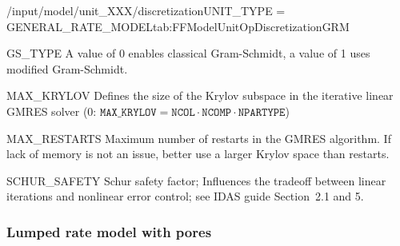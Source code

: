 \begin{condsubgroup}{/input/model/unit\_XXX/discretization}{UNIT\_TYPE = GENERAL\_RATE\_MODEL}{tab:FFModelUnitOpDiscretizationGRM}
\begin{dataset}[type=int,range={$\{0, 1\}$},length=1]{GS\_TYPE}
    A value of $0$ enables classical Gram-Schmidt, a value of 1 uses modified Gram-Schmidt.
  \end{dataset}
  \begin{dataset}[type=int,range={$\{0, \dots, \texttt{NCOL} \cdot \texttt{NCOMP} \cdot \texttt{NPARTYPE} \}$},length=1]{MAX\_KRYLOV}
    Defines the size of the Krylov subspace in the iterative linear GMRES solver (0: $\texttt{MAX\_KRYLOV} = \texttt{NCOL} \cdot \texttt{NCOMP} \cdot \texttt{NPARTYPE}$)
  \end{dataset}
  \begin{dataset}[type=int,range={$\geq 0$},length=1]{MAX\_RESTARTS}
    Maximum number of restarts in the GMRES algorithm. If lack of memory is not an issue, better use a larger Krylov space than restarts.
  \end{dataset}
  \begin{dataset}[type=double,range={$\geq 0$},length=1]{SCHUR\_SAFETY}
    Schur safety factor; Influences the tradeoff between linear iterations and nonlinear error control; see IDAS guide Section~2.1 and 5.
  \end{dataset}
\end{condsubgroup}

\subsubsection{Lumped rate model with pores}

